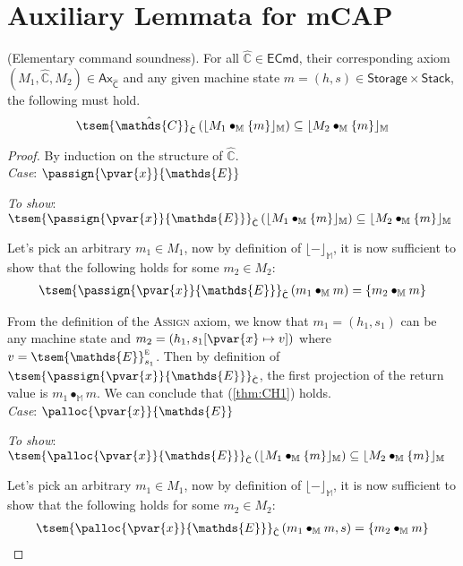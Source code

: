 \section{Auxiliary Lemmata for mCAP}

\thm \label{thm:eSound} (Elementary command soundness). For all $\hat{\mathds{C}} \in \mathsf{ECmd}$, their corresponding axiom $(M_1, \hat{\mathds{C}}, M_2) \in \mathsf{Ax}_{\hat{\mathsf{C}}}$ and any given machine state $m = (h, s) \in \mathsf{Storage} \times \mathsf{Stack}$, the following must hold.
\[
	\tsem{\hat{\mathds{C}}}_{\hat{\mathsf{C}}} \left( \lfloor M_1 \bullet_\mathbb{M} \{m\} \rfloor_\mathbb{M} \right) \subseteq \lfloor M_2 \bullet_\mathbb{M} \{m\} \rfloor_\mathbb{M}
\]
{\parindent0pt
\begin{proof}
By induction on the structure of $\hat{\mathds{C}}$. \\

\textit{Case}: $\passign{\pvar{x}}{\mathds{E}}$

\textit{To show}: $\tsem{\passign{\pvar{x}}{\mathds{E}}}_{\hat{\mathsf{C}}} \left( \lfloor M_1 \bullet_\mathbb{M} \{m\} \rfloor_\mathbb{M} \right) \subseteq \lfloor M_2 \bullet_\mathbb{M} \{m\} \rfloor_\mathbb{M}$

Let's pick an arbitrary $m_1 \in M_1$, now by definition of $\lfloor - \rfloor_\mathbb{M}$, it is now sufficient to show that the following holds for some $m_2 \in M_2$:
\begin{gather}
	\label{thm:CH1} \tsem{\passign{\pvar{x}}{\mathds{E}}}_{\hat{\mathsf{C}}} \left(m_1 \bullet_\mathbb{M} m \right) = \{ m_2 \bullet_\mathbb{M} m \}
\end{gather}

From the definition of the \textsc{Assign} axiom, we know that $m_1 = (h_1, s_1)$ can be any machine state and $m_2 = (h_1, s_1[\pvar{x} \mapsto v])$ where $v = \tsem{\mathds{E}}^\textsc{e}_{s_1}$. Then by definition of $\tsem{\passign{\pvar{x}}{\mathds{E}}}_{\hat{\mathsf{C}}}$, the first projection of the return value is $m_1 \bullet_\mathbb{M} m$. We can conclude that (\ref{thm:CH1}) holds.  \\

\textit{Case}: $\palloc{\pvar{x}}{\mathds{E}}$

\textit{To show}: $\tsem{\palloc{\pvar{x}}{\mathds{E}}}_{\hat{\mathsf{C}}} \left( \lfloor M_1 \bullet_\mathbb{M} \{m\} \rfloor_\mathbb{M} \right) \subseteq \lfloor M_2 \bullet_\mathbb{M} \{m\} \rfloor_\mathbb{M}$

Let's pick an arbitrary $m_1 \in M_1$, now by definition of $\lfloor - \rfloor_\mathbb{M}$, it is now sufficient to show that the following holds for some $m_2 \in M_2$:
\begin{gather}
	\label{thm:CH3} \tsem{\palloc{\pvar{x}}{\mathds{E}}}_{\hat{\mathsf{C}}} \left(m_1 \bullet_\mathbb{M} m, s \right) = \{ m_2 \bullet_\mathbb{M} m \}
\end{gather}


\end{proof}}
